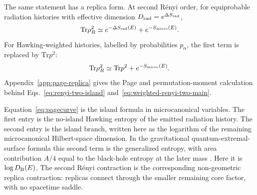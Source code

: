 \documentclass[12pt]{article}
\newcommand{\Tr}{\mathrm{Tr}}
\newcommand{\Smicro}{S_{\rm micro}}
\begin{document}
The same statement has a replica form.  At second R\'enyi order, for
equiprobable radiation histories with effective dimension
$D_{\rm rad}=e^{\Delta S_{\rm rad}}$,
\begin{equation}
    \Tr\rho_R^2
    \simeq
    e^{-\Delta S_{\rm rad}(E)}
    +
    e^{-\Smicro(E)} .
\label{eq:renyi-two-island}
\end{equation}
For Hawking-weighted histories, labelled by probabilities $p_\alpha$, the
first term is replaced by $\Tr p^2$:
\begin{equation}
    \Tr\rho_R^2
    \simeq
    \Tr p^2+e^{-\Smicro(E)} .
\label{eq:weighted-renyi-two-main}
\end{equation}
Appendix~\ref{app:page-replica} gives the Page and permutation-moment
calculation behind Eqs.~\eqref{eq:renyi-two-island}
and~\eqref{eq:weighted-renyi-two-main}.

Equation~\eqref{eq:pagecurve} is the island formula in microcanonical
variables.  The first entry is the no-island Hawking entropy of the emitted
radiation history.  The second entry is the island branch, written here as the
logarithm of the remaining microcanonical Hilbert-space dimension.  In the
gravitational quantum-extremal-surface formula this second term is the
generalized entropy, with area contribution $A/4$ equal to the black-hole
entropy at the later mass \cite{Penington2019,
AlmheiriEngelhardtMarolfMaxfield2019,
AlmheiriHartmanMaldacenaShaghoulianTajdini2021}.  Here it is
$\log D_{\rm B}(E)$.  The second R\'enyi contraction is the corresponding
non-geometric replica contraction: replicas connect through the smaller
remaining core factor, with no spacetime saddle.
\end{document}
